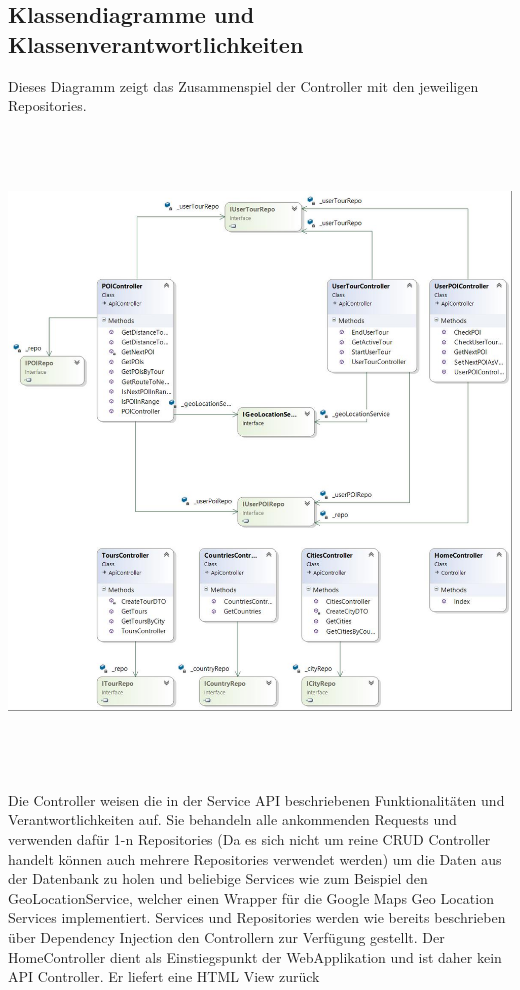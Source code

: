 \documentclass[a4paper,10pt,xetex]{article}
\begin{document}
\bigskip


\bigskip

\clearpage
\bigskip

\subsection[Klassendiagramme und Klassenverantwortlichkeiten]{ Klassendiagramme und Klassenverantwortlichkeiten}

  Dieses Diagramm zeigt das Zusammenspiel der Controller mit den jeweiligen Repositories.


\bigskip

\begin{center}
  \includegraphics[width=6.5in,height=6.6925in]{klassendiagramm_backend1.jpg}
\end{center}


  Die Controller weisen die in der Service API beschriebenen Funktionalit\"aten und Verantwortlichkeiten auf. Sie
  behandeln alle ankommenden Requests und verwenden daf\"ur 1-n Repositories (Da es sich nicht um reine CRUD Controller
  handelt k\"onnen auch mehrere Repositories verwendet werden) um die Daten aus der Datenbank zu holen und beliebige
  Services wie zum Beispiel den GeoLocationService, welcher einen Wrapper f\"ur die Google Maps Geo Location Services
  implementiert. Services und Repositories werden wie bereits beschrieben \"uber Dependency Injection den Controllern zur
  Verf\"ugung gestellt. Der HomeController dient als Einstiegspunkt der WebApplikation und ist daher kein API Controller.
  Er liefert eine HTML View zur\"uck
\end{document}
